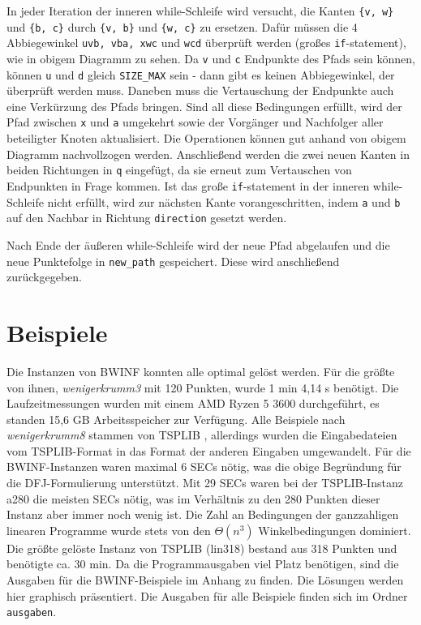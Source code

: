 \documentclass[a4paper, 10pt, ngerman]{article}
\begin{document}
In jeder Iteration der inneren while-Schleife wird versucht, die Kanten \verb|{v, w}| und \verb|{b, c}| durch \verb|{v, b}| und \verb|{w, c}| zu ersetzen. Dafür müssen die 4 Abbiegewinkel \verb|uvb, vba, xwc| und \verb|wcd| überprüft werden (großes \verb|if|-statement), wie in obigem Diagramm zu sehen. Da \verb|v| und \verb|c| Endpunkte des Pfads sein können, können \verb|u| und \verb|d| gleich \verb|SIZE_MAX| sein - dann gibt es keinen Abbiegewinkel, der überprüft werden muss. Daneben muss die Vertauschung der Endpunkte auch eine Verkürzung des Pfads bringen. Sind all diese Bedingungen erfüllt, wird der Pfad zwischen \verb|x| und \verb|a| umgekehrt sowie der Vorgänger und Nachfolger aller beteiligter Knoten aktualisiert. Die Operationen können gut anhand von obigem Diagramm nachvollzogen werden. Anschließend werden die zwei neuen Kanten in beiden Richtungen in \verb|q| eingefügt, da sie erneut zum Vertauschen von Endpunkten in Frage kommen. Ist das große \verb|if|-statement in der inneren while-Schleife nicht erfüllt, wird zur nächsten Kante vorangeschritten, indem \verb|a| und \verb|b| auf den Nachbar in Richtung \verb|direction| gesetzt werden.

Nach Ende der äußeren while-Schleife wird der neue Pfad abgelaufen und die neue Punktefolge in \verb|new_path| gespeichert. Diese wird anschließend zurückgegeben.

\section{Beispiele}

Die Instanzen von BWINF konnten alle optimal gelöst werden. Für die größte von ihnen, \emph{wenigerkrumm3} mit 120 Punkten, wurde 1 min 4,14 s benötigt. Die Laufzeitmessungen wurden mit einem AMD Ryzen 5 3600 durchgeführt, es standen 15,6 GB Arbeitsspeicher zur Verfügung. Alle Beispiele nach \emph{wenigerkrumm8} stammen von TSPLIB \cite{tsplib}, allerdings wurden die Eingabedateien vom TSPLIB-Format in das Format der anderen Eingaben umgewandelt. Für die BWINF-Instanzen waren maximal 6 SECs nötig, was die obige Begründung für die DFJ-Formulierung unterstützt. Mit 29 SECs waren bei der TSPLIB-Instanz a280 die meisten SECs nötig, was im Verhältnis zu den 280 Punkten dieser Instanz aber immer noch wenig ist. Die Zahl an Bedingungen der ganzzahligen linearen Programme wurde stets von den $\Theta(n^3)$ Winkelbedingungen dominiert. Die größte gelöste Instanz von TSPLIB (lin318) bestand aus 318 Punkten und benötigte ca. 30 min. Da die Programmausgaben viel Platz benötigen, sind die Ausgaben für die BWINF-Beispiele im Anhang zu finden. Die Lösungen werden hier graphisch präsentiert. Die Ausgaben für alle Beispiele finden sich im Ordner \verb|ausgaben|.
\end{document}
